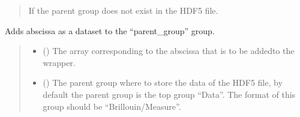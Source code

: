 \documentclass[letterpaper,10pt,english]{sphinxmanual}
\begin{document}
\begin{fulllineitems}
\begin{fulllineitems}
\begin{quote}
\begin{description}
\begin{itemize}
\end{itemize}

\sphinxAtStartPar
{\hyperref[\detokenize{source/HDF5_BLS:HDF5_BLS.WrapperError.WrapperError_StructureError}]{}} \textendash{} If the parent group does not exist in the HDF5 file.

\end{description}\end{quote}

\end{fulllineitems}


\begin{fulllineitems}
\label{\detokenize{source/HDF5_BLS:HDF5_BLS.wrapper.Wrapper.add_abscissa}}
\pysigstartsignatures
\pysiglinewithargsret
{}
{\sphinxparamcomma {}\sphinxparamcomma {}\sphinxparamcomma {}\sphinxparamcomma {}\sphinxparamcomma {}\sphinxparamcomma {}}
{}
\pysigstopsignatures
\sphinxAtStartPar
Adds abscissa as a dataset to the “parent\_group” group.
\begin{quote}\begin{description}
\begin{itemize}
\item {} 
\sphinxAtStartPar
{} () \textendash{} The array corresponding to the abscissa that is to be addedto the wrapper.

\item {} 
\sphinxAtStartPar
{} (\sphinxstyleliteralemphasis{\sphinxupquote{, }}) \textendash{} The parent group where to store the data of the HDF5 file, by default the parent group is the top group “Data”. The format of this group should be “Brillouin/Measure”.


\end{itemize}
\end{description}
\end{quote}
\end{fulllineitems}
\end{fulllineitems}
\end{document}

